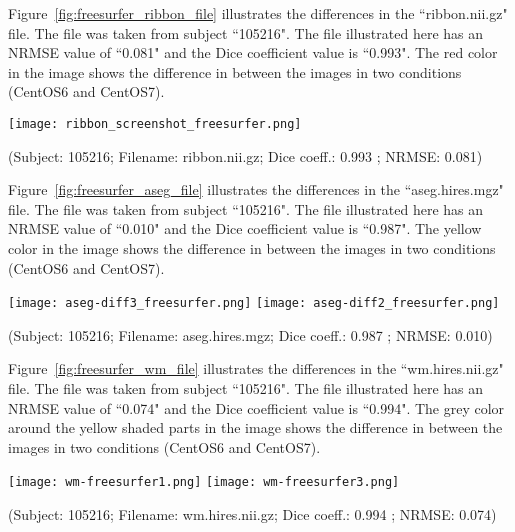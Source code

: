 Figure~\ref{fig:freesurfer_ribbon_file} illustrates the differences in the ``ribbon.nii.gz" file. The file was taken from subject ``105216". The file illustrated here has an NRMSE value of ``0.081" and the Dice coefficient value is ``0.993". The red color in the image shows the difference in between the images in two conditions (CentOS6 and CentOS7).
\hfill \break
\begin{center}
\texttt{[image: ribbon\_screenshot\_freesurfer.png]}
\caption*{(Subject: 105216; Filename: ribbon.nii.gz; Dice coeff.: 0.993 ; NRMSE: 0.081)}
\label{fig:freesurfer_ribbon_file}
\end{center}
\hfill \break

Figure~\ref{fig:freesurfer_aseg_file} illustrates the differences in the ``aseg.hires.mgz" file. The file was taken from subject ``105216". The file illustrated here has an NRMSE value of ``0.010" and the Dice coefficient value is ``0.987". The yellow color in the image shows the difference in between the images in two conditions (CentOS6 and CentOS7).
\hfill \break
\begin{center}
\texttt{[image: aseg-diff3\_freesurfer.png]}%
\texttt{[image: aseg-diff2\_freesurfer.png]}
\caption*{(Subject: 105216; Filename: aseg.hires.mgz; Dice coeff.: 0.987 ; NRMSE: 0.010)}
\label{fig:freesurfer_aseg_file}
\end{center}
\hfill \break

Figure~\ref{fig:freesurfer_wm_file} illustrates the differences in the ``wm.hires.nii.gz" file. The file was taken from subject ``105216". The file illustrated here has an NRMSE value of ``0.074" and the Dice coefficient value is ``0.994". The grey color around the yellow shaded parts in the image shows the difference in between the images in two conditions (CentOS6 and CentOS7).

\hfill \break
\begin{center}
\texttt{[image: wm-freesurfer1.png]}%
\texttt{[image: wm-freesurfer3.png]}
\caption*{(Subject: 105216; Filename: wm.hires.nii.gz; Dice coeff.: 0.994 ; NRMSE: 0.074)}
\label{fig:freesurfer_wm_file}
\end{center}

